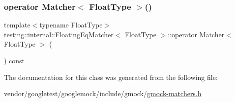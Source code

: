 \mbox{\label{classtesting_1_1internal_1_1_floating_eq_matcher_abd377dfafd89bdb7effdd80989aeee80}} 
\subsubsection{\texorpdfstring{operator Matcher$<$ Float\+Type $>$()}{operator Matcher< FloatType >()}}
{\footnotesize\ttfamily template$<$typename Float\+Type$>$ \\
\hyperlink{classtesting_1_1internal_1_1_floating_eq_matcher}{testing\+::internal\+::\+Floating\+Eq\+Matcher}$<$ Float\+Type $>$\+::operator \hyperlink{classtesting_1_1_matcher}{Matcher}$<$ Float\+Type $>$ (\begin{DoxyParamCaption}{ }\end{DoxyParamCaption}) const\hspace{0.3cm}{\ttfamily [inline]}}



The documentation for this class was generated from the following file\+:\begin{DoxyCompactItemize}
\item 
vendor/googletest/googlemock/include/gmock/\hyperlink{gmock-matchers_8h}{gmock-\/matchers.\+h}\end{DoxyCompactItemize}
